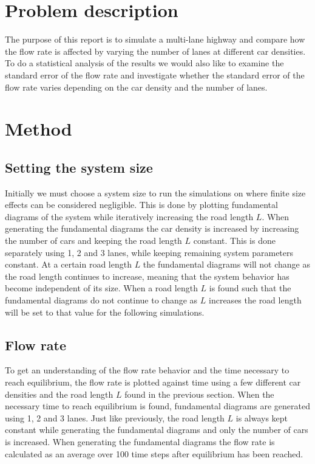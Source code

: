 \documentclass[a4paper,12pt]{article}
\begin{document}

\section*{Problem description}
The purpose of this report is to simulate a multi-lane highway and compare how the flow rate is affected by varying the number
of lanes at different car densities.
To do a statistical analysis of the results we would also like to examine the standard error of the flow rate and investigate whether the 
standard error of the flow rate varies depending on the car density and the number of lanes.

\section*{Method}
\subsection*{Setting the system size}
Initially we must choose a system size to run the simulations on where finite size effects can be considered negligible. This is done by plotting fundamental
diagrams of the system while iteratively increasing the road length $L$. When generating the fundamental diagrams the car density is increased by increasing the number
of cars and keeping the road length $L$ constant. This is done separately using 1, 2 and 3 lanes, while keeping remaining system
parameters constant. At a certain road length $L$ the fundamental diagrams will not change as the road length
continues to increase, meaning that the system behavior has become independent of its size. When a road length $L$ is found such that the fundamental diagrams
do not continue to change as $L$ increases the road length will be set to that value for the following simulations.

\subsection*{Flow rate}
To get an understanding of the flow rate behavior and the time necessary to reach equilibrium, the flow rate is plotted against time using a few different 
car densities and the road length $L$ found in the previous section. When the necessary time to reach equilibrium is found, fundamental diagrams are generated using 1, 2 and 3 lanes. Just like previously,
the road length $L$ is always kept constant while generating the fundamental diagrams and only the number of cars is increased. When generating the fundamental diagrams
the flow rate is calculated as an average over 100 time steps after equilibrium has been reached.
\end{document}
